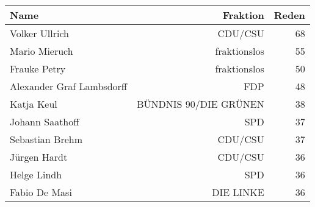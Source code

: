 
\begin{tabular}{lrr}
\toprule
Name & Fraktion & Reden\\
\midrule
Volker Ullrich & CDU/CSU & 68\\
Mario Mieruch & fraktionslos & 55\\
Frauke Petry & fraktionslos & 50\\
Alexander Graf Lambsdorff & FDP & 48\\
Katja Keul & BÜNDNIS 90/DIE GRÜNEN & 38\\
Johann Saathoff & SPD & 37\\
Sebastian Brehm & CDU/CSU & 37\\
Jürgen Hardt & CDU/CSU & 36\\
Helge Lindh & SPD & 36\\
Fabio De Masi & DIE LINKE & 36\\
\bottomrule
\end{tabular}